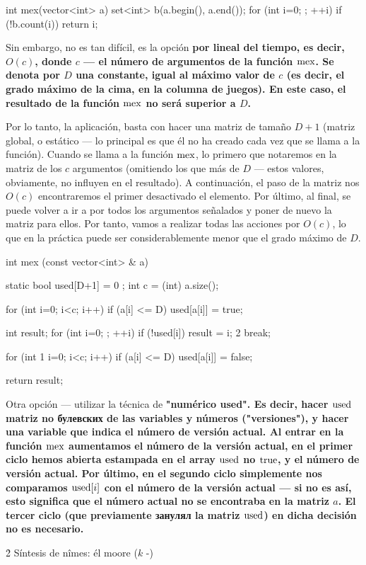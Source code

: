 \code
int mex(vector<int> a) {
set<int> b(a.begin(), a.end());
for (int i=0; ; ++i)
if (!b.count(i))
return i;
}
\endcode

Sin embargo, no es tan difícil, es la opción \bf{por lineal del tiempo}, es decir, $O (c)$, donde $c$ --- el número de argumentos de la función $\rm mex$. Se denota por $D$ una constante, igual al máximo valor de $c$ (es decir, el grado máximo de la cima, en la columna de juegos). En este caso, el resultado de la función $\rm mex$ no será superior a $D$.

Por lo tanto, la aplicación, basta con hacer una matriz de tamaño $D+1$ (matriz global, o estático --- lo principal es que él no ha creado cada vez que se llama a la función). Cuando se llama a la función $\rm mex$, lo primero que notaremos en la matriz de los $c$ argumentos (omitiendo los que más de $D$ --- estos valores, obviamente, no influyen en el resultado). A continuación, el paso de la matriz nos $O (c)$ encontraremos el primer desactivado el elemento. Por último, al final, se puede volver a ir a por todos los argumentos señalados y poner de nuevo la matriz para ellos. Por tanto, vamos a realizar todas las acciones por $O (c)$, lo que en la práctica puede ser considerablemente menor que el grado máximo de $D$.

\code
int mex (const vector<int> & a) {
static bool used[D+1] = { 0 };
int c = (int) a.size();

for (int i=0; i<c; i++)
if (a[i] <= D)
used[a[i]] = true;

int result;
for (int i=0; ; ++i)
if (!used[i]) {
result = i;
2 break;
}

for (int 1 i=0; i<c; i++)
if (a[i] <= D)
used[a[i]] = false;

return result;
}
\endcode

Otra opción --- utilizar la técnica de \bf{"numérico used"}. Es decir, hacer $\rm used$ matriz no булевских de las variables y números ("versiones"), y hacer una variable que indica el número de versión actual. Al entrar en la función $\rm mex$ aumentamos el número de la versión actual, en el primer ciclo hemos abierta estampada en el array $\rm used$ no $\rm true$, y el número de versión actual. Por último, en el segundo ciclo simplemente nos comparamos ${\rm used}[i]$ con el número de la versión actual --- si no es así, esto significa que el número actual no se encontraba en la matriz $a$. El tercer ciclo (que previamente занулял la matriz $\rm used$) en dicha decisión no es necesario.


\h2{ Síntesis de nîmes: él moore ($k$ -) }

